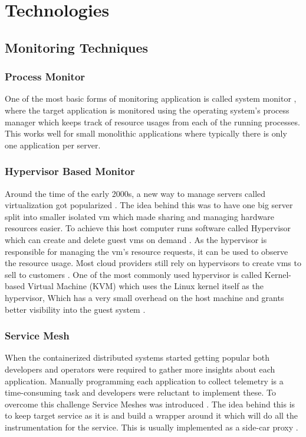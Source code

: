 \section{Technologies}

\subsection{Monitoring Techniques}

\subsubsection{Process Monitor}

One of the most basic forms of monitoring application is called system monitor \citep{WhatisaS27:online}, where the target application is monitored using the operating system's process manager which keeps track of resource usages from each of the running processes. This works well for small monolithic applications where typically there is only one application per server.

\subsubsection{Hypervisor Based Monitor}

Around the time of the early 2000s, a new way to manage servers called virtualization got popularized  \citep{Whatisvi12:online}. The idea behind this was to have one big server split into smaller isolated \ac{vm} which made sharing and managing hardware resources easier. To achieve this host computer runs software called Hypervisor which can create and delete guest \acp{vm} on demand \citep{Mergen_Uhlig_Krieger_Xenidis_2006}. As the hypervisor is responsible for managing the \ac{vm}'s resource requests, it can be used to observe the resource usage. Most cloud providers still rely on hypervisors to create \acp{vm} to sell to customers \citep{7waysweh13:online}. One of the most commonly used hypervisor is called Kernel-based Virtual Machine (KVM) which uses the Linux kernel itself as the  hypervisor, Which has a very small overhead on the host machine and grants better visibility into the guest system \citep{kivity2007kvm}.

\subsubsection{Service Mesh} \label{sec:service-mesh}

When the containerized distributed systems started getting popular both developers and operators were required to gather more insights about each application. Manually programming each application to collect telemetry is a time-consuming task and developers were reluctant to implement these. To overcome this challenge Service Meshes was introduced \citep{li2019service}. The idea behind this is to keep target service as it is and build a wrapper around it which will do all the instrumentation for the service. This is usually implemented as a side-car proxy \citep{Whatissi48:online}. 

